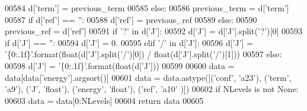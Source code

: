 \begin{DoxyCode}
00584             d[\textcolor{stringliteral}{'term'}] = previous\_term
00585         \textcolor{keywordflow}{else}:
00586             previous\_term = d[\textcolor{stringliteral}{'term'}]
00587         \textcolor{keywordflow}{if} d[\textcolor{stringliteral}{'ref'}] == \textcolor{stringliteral}{''}:
00588             d[\textcolor{stringliteral}{'ref'}] = previous\_ref
00589         \textcolor{keywordflow}{else}:
00590             previous\_ref = d[\textcolor{stringliteral}{'ref'}]
00591         \textcolor{keywordflow}{if} \textcolor{stringliteral}{'?'} \textcolor{keywordflow}{in} d[\textcolor{stringliteral}{'J'}]:
00592             d[\textcolor{stringliteral}{'J'}] = d[\textcolor{stringliteral}{'J'}].split(\textcolor{stringliteral}{'?'})[0]
00593         \textcolor{keywordflow}{if} d[\textcolor{stringliteral}{'J'}] == \textcolor{stringliteral}{''}:
00594             d[\textcolor{stringliteral}{'J'}] = 0.
00595         \textcolor{keywordflow}{elif} \textcolor{stringliteral}{'/'} \textcolor{keywordflow}{in} d[\textcolor{stringliteral}{'J'}]:
00596             d[\textcolor{stringliteral}{'J'}] = \textcolor{stringliteral}{'\{0:.1f\}'}.format(float(d[\textcolor{stringliteral}{'J'}].split(\textcolor{stringliteral}{'/'})[0]) / float(d[\textcolor{stringliteral}{'J'}].split(\textcolor{stringliteral}{'/'})[1]))
00597         \textcolor{keywordflow}{else}:
00598             d[\textcolor{stringliteral}{'J'}] = \textcolor{stringliteral}{'\{0:.1f\}'}.format(float(d[\textcolor{stringliteral}{'J'}]))
00599            
00600     data = data[data[\textcolor{stringliteral}{'energy'}].argsort()]
00601     data = data.astype([(\textcolor{stringliteral}{'conf'}, \textcolor{stringliteral}{'a23'}), (\textcolor{stringliteral}{'term'}, \textcolor{stringliteral}{'a9'}), (\textcolor{stringliteral}{'J'}, \textcolor{stringliteral}{'float'}), (\textcolor{stringliteral}{'energy'}, \textcolor{stringliteral}{'float'}), (\textcolor{stringliteral}{'ref'}, \textcolor{stringliteral}{'a10'}
      )])
00602     \textcolor{keywordflow}{if} NLevels \textcolor{keywordflow}{is} \textcolor{keywordflow}{not} \textcolor{keywordtype}{None}:
00603         data = data[0:NLevels]
00604     \textcolor{keywordflow}{return} data
00605 

\end{DoxyCode}
